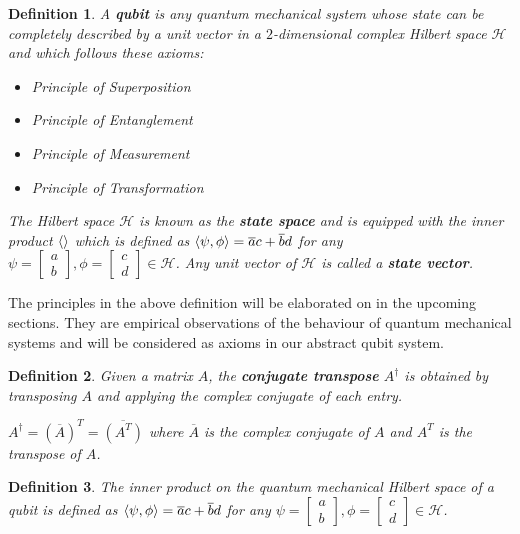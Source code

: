 \documentclass[12pt,twoside,fleqn]{report}
\theoremstyle{thmstyle}
\newtheorem{defn}{Definition}[chapter]
\begin{document}
\begin{samepage}
\begin{defn}
    A \textbf{qubit} is any quantum mechanical system whose state can be completely described by a unit vector in a $2$-dimensional complex Hilbert space $\mathcal{H}$ and which follows these axioms: 
\begin{itemize}
    \item Principle of Superposition
    \item Principle of Entanglement
    \item Principle of Measurement
    \item Principle of Transformation
\end{itemize}
    The Hilbert space $\mathcal{H}$ is known as the \textbf{state space} and is equipped with the inner product $\braket{}$ which is defined as $\braket{\psi, \phi} = \overline{a} c + \overline{b} d$ for any $\psi = \begin{bmatrix} a\\b\end{bmatrix}, \phi = \begin{bmatrix} c \\ d \end{bmatrix} \in \mathcal{H}$. Any unit vector of $\mathcal{H}$ is called a \textbf{state vector}.
\end{defn}

The principles in the above definition will be elaborated on in the upcoming sections.
They are empirical observations of the behaviour of quantum mechanical systems and will be considered as axioms in our abstract qubit system.
\end{samepage}

\begin{defn}
    Given a matrix $A$, the \textbf{conjugate transpose} $A^\dagger$ is obtained by transposing $A$ and applying the complex conjugate of each entry.

    $A^\dagger = (\overline{A})^T = \overline{(A^T)}$ where $\overline{A}$ is the complex conjugate of $A$ and $A^T$ is the transpose of $A$.
\end{defn}

\begin{defn}
    The inner product on the quantum mechanical Hilbert space of a qubit is defined as $\braket{\psi, \phi} = \overline{a} c + \overline{b} d$ for any  $\psi = \begin{bmatrix} a\\b\end{bmatrix}, \phi = \begin{bmatrix} c \\ d \end{bmatrix} \in \mathcal{H}$. 
\end{defn}
\end{document}
